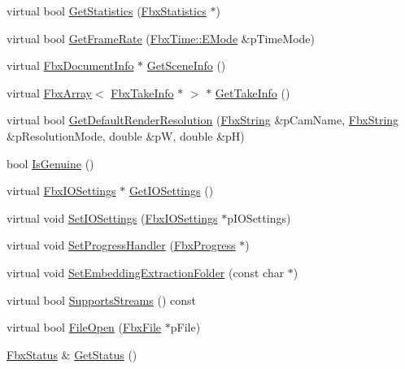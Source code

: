 \begin{DoxyCompactItemize}
\item 
virtual bool \hyperlink{class_fbx_reader_ae14762357b4a8ecce10a266b06cc3117}{Get\+Statistics} (\hyperlink{class_fbx_statistics}{Fbx\+Statistics} $\ast$)
\item 
virtual bool \hyperlink{class_fbx_reader_a3b218671126e70a29f644407a7f307e9}{Get\+Frame\+Rate} (\hyperlink{class_fbx_time_acc529b00a0e8d4c3da3702449ca93031}{Fbx\+Time\+::\+E\+Mode} \&p\+Time\+Mode)
\item 
virtual \hyperlink{class_fbx_document_info}{Fbx\+Document\+Info} $\ast$ \hyperlink{class_fbx_reader_acb928634641ad5f99d709478c7a234be}{Get\+Scene\+Info} ()
\item 
virtual \hyperlink{class_fbx_array}{Fbx\+Array}$<$ \hyperlink{class_fbx_take_info}{Fbx\+Take\+Info} $\ast$ $>$ $\ast$ \hyperlink{class_fbx_reader_a9d7b40684bb3181219945eb0c73fb9d1}{Get\+Take\+Info} ()
\item 
virtual bool \hyperlink{class_fbx_reader_ab3fb0fb0e0c311cb58e15092c82637ee}{Get\+Default\+Render\+Resolution} (\hyperlink{class_fbx_string}{Fbx\+String} \&p\+Cam\+Name, \hyperlink{class_fbx_string}{Fbx\+String} \&p\+Resolution\+Mode, double \&pW, double \&pH)
\item 
bool \hyperlink{class_fbx_reader_a7c9dad350ae8255c7346b279b5cf14bf}{Is\+Genuine} ()
\item 
virtual \hyperlink{class_fbx_i_o_settings}{Fbx\+I\+O\+Settings} $\ast$ \hyperlink{class_fbx_reader_a27bef92675a5f95f18dfe105a0c06d8b}{Get\+I\+O\+Settings} ()
\item 
virtual void \hyperlink{class_fbx_reader_af39e468081c3ebe63565409ef36f833a}{Set\+I\+O\+Settings} (\hyperlink{class_fbx_i_o_settings}{Fbx\+I\+O\+Settings} $\ast$p\+I\+O\+Settings)
\item 
virtual void \hyperlink{class_fbx_reader_aeba190e276718b1abfa6c26a83d2c363}{Set\+Progress\+Handler} (\hyperlink{class_fbx_progress}{Fbx\+Progress} $\ast$)
\item 
virtual void \hyperlink{class_fbx_reader_a640eef510ddb298b2eaad0545b79de66}{Set\+Embedding\+Extraction\+Folder} (const char $\ast$)
\item 
virtual bool \hyperlink{class_fbx_reader_ab08a9e71a059ef6052e7fe2d8ba6c35d}{Supports\+Streams} () const
\item 
virtual bool \hyperlink{class_fbx_reader_a9e334ad0c2abd069c35a016413a8adcd}{File\+Open} (\hyperlink{class_fbx_file}{Fbx\+File} $\ast$p\+File)
\item 
\hyperlink{class_fbx_status}{Fbx\+Status} \& \hyperlink{class_fbx_reader_a7462b93f063eac16b6dd2516c4c3d2f1}{Get\+Status} ()
\end{DoxyCompactItemize}
